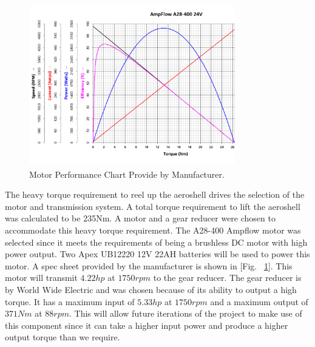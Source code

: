 \begin{figure}[ht]
\centering
\includegraphics[width=0.8\textwidth]{Figures/A28-400_Chart.png}
\caption{\label{fig:A28-400_Chart.png} Motor Performance Chart Provide by Manufacturer.}
\end{figure}

\indent\indent The heavy torque requirement to reel up the aeroshell drives the selection of the motor and transmission system. A total torque requirement to lift the aeroshell was calculated to be 235Nm. A motor and a gear reducer were chosen to accommodate this heavy torque requirement. The A28-400 Ampflow motor was selected since it meets the requirements of being a brushless DC motor with high power output. Two Apex UB12220 12V 22AH batteries will be used to power this motor. A spec sheet provided by the manufacturer is shown in [Fig. ~\ref{fig:A28-400_Chart.png}]. This motor will transmit $4.22 hp$ at $1750 rpm$ to the gear reducer. The gear reducer is by World Wide Electric and was chosen because of its ability to output a high torque. It has a maximum input of $5.33 hp$ at $1750 rpm$ and a maximum output of $371 Nm$ at $88 rpm$. This will allow future iterations of the project to make use of this component since it can take a higher input power and produce a higher output torque than we require.



 


 


